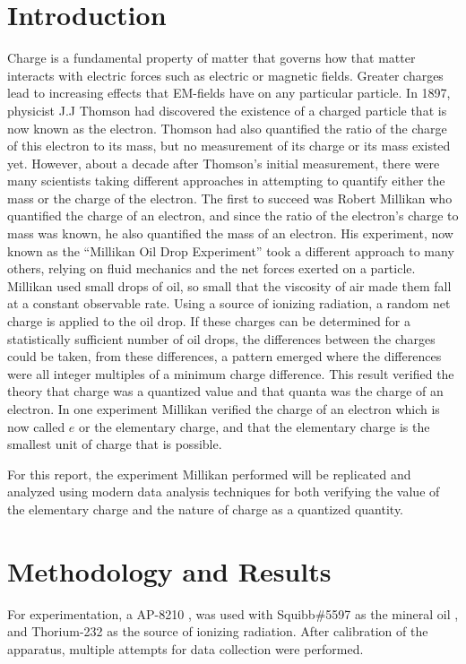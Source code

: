 \documentclass[rc]{physicsinprogress}
\begin{document}
\section{Introduction}
Charge is a fundamental property of matter that governs how that matter interacts with electric forces such as electric or magnetic fields. Greater charges lead to increasing effects that EM-fields have on any particular particle. In 1897, physicist J.J Thomson had discovered the existence of a charged particle that is now known as the electron\cite{thomson}. Thomson had also quantified the ratio of the charge of this electron to its mass, but no measurement of its charge or its mass existed yet. However, about a decade after Thomson's initial measurement, there were many scientists taking different approaches in attempting to quantify either the mass or the charge of the electron. The first to succeed was Robert Millikan who quantified the charge of an electron, and since the ratio of the electron's charge to mass was known, he also quantified the mass of an electron. His experiment, now known as the ``Millikan Oil Drop Experiment'' took a different approach to many others, relying on fluid mechanics and the net forces exerted on a particle. Millikan used small drops of oil, so small that the viscosity of air made them fall at a constant observable rate. Using a source of ionizing radiation, a random net charge is applied to the oil drop. If these charges can be determined for a statistically sufficient number of oil drops, the differences between the charges could be taken, from these differences, a pattern emerged where the differences were all integer multiples of a minimum charge difference. This result verified the theory that charge was a quantized value and that quanta was the charge of an electron. In one experiment Millikan verified the charge of an electron which is now called $e$ or the elementary charge, and that the elementary charge is the smallest unit of charge that is possible. 

For this report, the experiment Millikan performed will be replicated and analyzed using modern data analysis techniques for both verifying the value of the elementary charge and the nature of charge as a quantized quantity. 



\section{Methodology and Results}
For experimentation, a AP-8210 \cite{pascoap8210}, was used with Squibb\#5597 as the mineral oil \cite{squibb}, and Thorium-232 \cite{pascoap8210} as the source of ionizing radiation. After calibration of the apparatus, multiple attempts for data collection were performed. 
\end{document}
